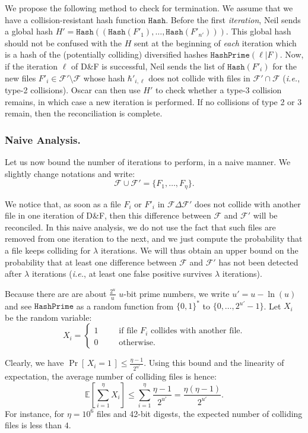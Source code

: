 \documentclass{llncs}
\newcommand{\Prob}[1]{{\Pr\left[\,{#1}\,\right]}}
\newcommand{\EE}[1]{{\mathbb{E}\left[{#1}\right]}}
\newcommand{\Files}{\mathcal{F}}
\newcommand{\df}{D\&F\xspace}
\newcommand{\ie}{\textit{i.e.}\xspace}
\newcommand{\Hash}{\ensuremath{\mathtt{Hash}}}
\newcommand{\HashPrime}{\ensuremath{\mathtt{HashPrime}}}
\begin{document}
We propose the following method to check for termination. We assume that we have a collision-resistant hash function $\Hash$.
Before the first \emph{iteration}, Neil sends a global hash $H' = \Hash((\Hash(F'_1),\dots,\Hash(F'_{n'})))$.
This global hash should not be confused with the $H$ sent at the beginning of \emph{each} iteration which is a hash of the (potentially colliding) diversified hashes $ \HashPrime(\ell|F)$.
Now, if the iteration $\ell$ of \df is successful, Neil sends the list of $\Hash(F'_i)$ for the new files $F'_i \in \Files' \setminus \Files$ whose hash $\hbar'_{i,\ell}$ does not collide with files in $\Files' \cap \Files$ (\ie, type-2 collisions).
Oscar can then use $H'$ to check whether a type-3 collision remains, in which case a new iteration is performed. If no collisions of type 2 or 3 remain, then the reconciliation is complete.

\subsubsection{Naive Analysis.}

Let us now bound the number of iterations to perform, in a naive manner.
We slightly change notations and write:
\[ \Files \cup \Files' = \{ F_1, \dots, F_\eta \}. \]

We notice that, as soon as a file $F_i$ or $F'_i$ in $\Files \Delta \Files'$ does not collide with another file in one iteration of \df, then this difference between $\Files$ and $\Files'$ will be reconciled.
In this naive analysis, we do not use the fact that such files are removed from one iteration to the next, and we just compute the probability that a file keeps colliding for $\lambda$ iterations. We will thus obtain an upper bound on the probability that at least one difference between $\Files$ and $\Files'$ has not been detected after $\lambda$ iterations (\ie, at least one false positive survives $\lambda$ iterations).

Because there are are about $\frac{2^u}{u}$ $u$-bit prime numbers, we write $u' = u - \ln(u)$ and see $\HashPrime$ as a random function from $\{0,1\}^*$ to $\{0,\dots,2^{u'}-1\}$. Let $X_i$ be the random variable:
\[
X_i =
\left\{
\begin{array}{lcl}
1 & ~~~~&  \mbox{if file $F_i$ collides with another file.}\\
0 & ~~~~&  \mbox{otherwise.}
\end{array}
\right.
\]

Clearly, we have $\Prob{X_i = 1} \le \frac{\eta -1}{2^{u'}}$.
Using this bound and the linearity of expectation, the average number of colliding files is hence:
\[ \EE{\sum_{i=1}^{\eta} X_i} \le \sum_{i=1}^{\eta} \frac{\eta -1}{2^{u'}} = \frac{\eta (\eta - 1)}{2^{u'}}. \]
For instance, for $\eta=10^6$ files and 42-bit digests, the expected number of colliding files is less than $4$.
\end{document}
